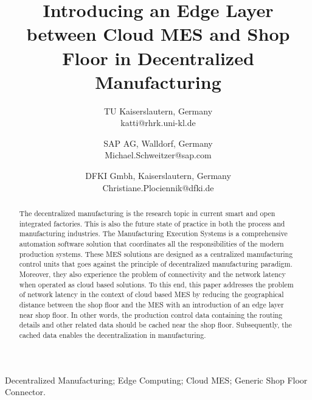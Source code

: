 \documentclass[10pt,conference,compsocconf]{IEEEtran}
\begin{document}
%
\title{\textbf{\Large Introducing an Edge Layer between Cloud MES and Shop Floor in Decentralized Manufacturing}\\[0.2ex]}




\author{
TU Kaiserslautern, Germany\\
katti@rhrk.uni-kl.de
\and
{}
SAP AG, Walldorf, Germany\\
 Michael.Schweitzer@sap.com
\and
{}
DFKI Gmbh, Kaiserslautern, Germany\\
Christiane.Plociennik@dfki.de}
\maketitle
\begin{abstract}
The decentralized manufacturing is the research topic in current smart and open integrated factories. This is also the future state of practice in both the process and manufacturing industries. The Manufacturing Execution Systems is a comprehensive automation software solution that coordinates all the responsibilities of the modern production systems. These MES solutions are designed as a centralized manufacturing control units that goes against the principle of decentralized manufacturing paradigm. Moreover, they also experience the problem of connectivity and the network latency when operated as cloud based solutions. To this end, this paper addresses the problem of network latency in the context of cloud based MES by reducing the geographical distance between the shop floor and the MES with an introduction of an edge layer near shop floor. In other words, the production control data containing the routing details and other related data should be cached near the shop floor. Subsequently, the cached data enables the decentralization in manufacturing.
\end{abstract}

\begin{IEEEkeywords}
Decentralized Manufacturing; Edge Computing; Cloud MES; Generic Shop Floor Connector.%
\end{IEEEkeywords}
\end{document}

